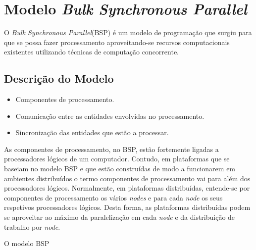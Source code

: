 \chapter{Modelo \textit{Bulk Synchronous Parallel}}

O \textit{Bulk Synchronous Parallel}(BSP) é um modelo de programação que 
surgiu para que se possa fazer processamento aproveitando-se recursos 
computacionais existentes utilizando técnicas de computação concorrente.

\section{Descrição do Modelo}

\begin{itemize} 
A base do modelo de programação BSP consiste no seguinte:
 \item Componentes de processamento.
 \item Comunicação entre as entidades envolvidas no processamento.
 \item Sincronização das entidades que estão a processar.
\end{itemize}

As componentes de processamento, no BSP, estão fortemente ligadas a 
processadores lógicos de um computador. Contudo, em plataformas que se baseiam 
no modelo BSP e que estão construídas de modo a funcionarem em ambientes 
distribuídos o termo componentes de processamento vai para além dos 
processadores lógicos. Normalmente, em plataformas distribuídas, entende-se por 
componentes de processamento os vários \textit{nodes} e para cada \textit{node} 
os seus respetivos processadores lógicos. Desta forma, as plataformas 
distribuídas podem se aproveitar ao máximo da paralelização em cada 
\textit{node} e da distribuição de trabalho por \textit{node}.

O modelo BSP


